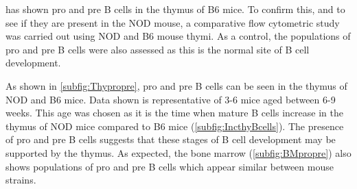 \citet{Akashi2000} has shown pro and pre B cells in the thymus of B6 mice. 
To confirm this, and to see if they are present in the NOD mouse, a comparative flow cytometric study was carried out using NOD and B6 mouse thymi.
As a control, the populations of pro and pre B cells were also assessed as this is the normal site of B cell development.



As shown in \cref{subfig:Thypropre}, pro and pre B cells can be seen in the thymus of NOD and B6 mice.
Data shown is representative of 3-6 mice aged between 6-9 weeks. %
This age was chosen as it is the time when mature B cells increase in the thymus of NOD mice compared to B6 mice (\cref{subfig:IncthyBcells}).
The presence of pro and pre B cells suggests that these stages of B cell development may be supported by the thymus. 
As expected, the bone marrow (\cref{subfig:BMpropre}) also shows populations of pro and pre B cells which appear similar between mouse strains.





